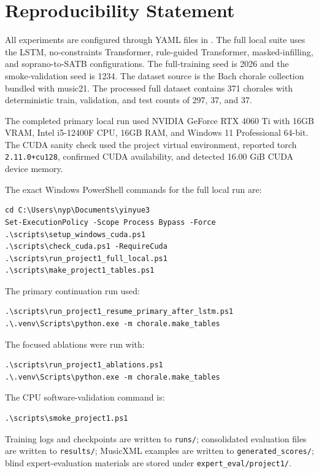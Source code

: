 \section{Reproducibility Statement}

All experiments are configured through YAML files in . The full local suite uses the LSTM, no-constraints Transformer, rule-guided Transformer, masked-infilling, and soprano-to-SATB configurations. The full-training seed is 2026 and the smoke-validation seed is 1234. The dataset source is the Bach chorale collection bundled with music21. The processed full dataset contains 371 chorales with deterministic train, validation, and test counts of 297, 37, and 37.

The completed primary local run used NVIDIA GeForce RTX 4060 Ti with 16GB VRAM, Intel i5-12400F CPU, 16GB RAM, and Windows 11 Professional 64-bit. The CUDA sanity check used the project virtual environment, reported torch \texttt{2.11.0+cu128}, confirmed CUDA availability, and detected 16.00 GiB CUDA device memory.

The exact Windows PowerShell commands for the full local run are:
\begin{verbatim}
cd C:\Users\nyp\Documents\yinyue3
Set-ExecutionPolicy -Scope Process Bypass -Force
.\scripts\setup_windows_cuda.ps1
.\scripts\check_cuda.ps1 -RequireCuda
.\scripts\run_project1_full_local.ps1
.\scripts\make_project1_tables.ps1
\end{verbatim}
The primary continuation run used:
\begin{verbatim}
.\scripts\run_project1_resume_primary_after_lstm.ps1
.\.venv\Scripts\python.exe -m chorale.make_tables
\end{verbatim}
The focused ablations were run with:
\begin{verbatim}
.\scripts\run_project1_ablations.ps1
.\.venv\Scripts\python.exe -m chorale.make_tables
\end{verbatim}
The CPU software-validation command is:
\begin{verbatim}
.\scripts\smoke_project1.ps1
\end{verbatim}
Training logs and checkpoints are written to \texttt{runs/}; consolidated evaluation files are written to \texttt{results/}; MusicXML examples are written to \texttt{generated\_scores/}; blind expert-evaluation materials are stored under \texttt{expert\_eval/project1/}.
